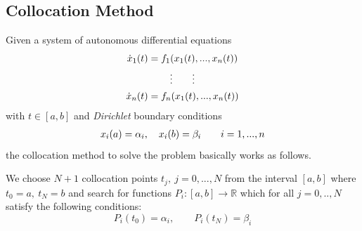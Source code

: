 \documentclass[letterpaper,10pt,english]{sphinxmanual}
\begin{document}
\subsection{Collocation Method}
\label{guide/background:collocation-method}\label{guide/background:id1}
Given a system of autonomous differential equations
\begin{gather}
\begin{split}\dot{x}_1(t) = f_1(x_1(t),...,x_n(t))\end{split}\notag\\\begin{split}\vdots \qquad \vdots\end{split}\notag\\\begin{split}\dot{x}_n(t) = f_n(x_1(t),...,x_n(t))\end{split}\notag
\end{gather}
with \(t \in [a, b]\) and \emph{Dirichlet} boundary conditions
\begin{gather}
\begin{split}x_i(a) = \alpha_i,\quad x_i(b) = \beta_i \qquad i = 1,...,n\end{split}\notag
\end{gather}
the collocation method to solve the problem basically works as follows.

We choose \(N+1\) collocation points \(t_j,\ j = 0,...,N\) from the interval
\([a, b]\) where \(t_0 = a,\ t_{N} = b\) and search for functions
\(P_i:[a,b] \rightarrow \mathbb{R}\) which for all \(j = 0,..,N\) satisfy the
following conditions:
\begin{equation}
   P_i(t_0) = \alpha_i, \qquad P_i(t_N) = \beta_i
\end{equation}
\end{document}
